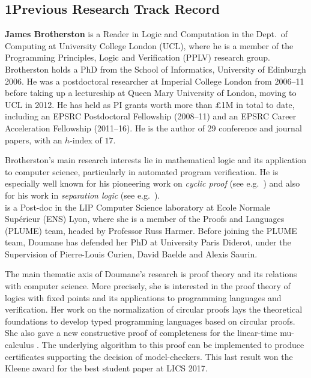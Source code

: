 \documentclass[11pt,twocolumn]{article}
\begin{document}


\begin{abstract}
  
\end{abstract}

\subsection*{1\quad Previous Research Track Record}

{\bf James Brotherston} is a Reader in Logic and Computation in the Dept.\ of Computing at University College London (UCL), where he is a member of the Programming Principles, Logic and Verification (PPLV) research group.  Brotherston holds a PhD from the School of Informatics, University of Edinburgh 2006.  He was a postdoctoral researcher at Imperial College London from 2006--11 before taking up a lectureship at Queen Mary University of London, moving to UCL in 2012. He has held as PI grants worth more than $\pounds$1M in total to date, including an EPSRC Postdoctoral Fellowship (2008--11) and an EPSRC Career Acceleration Fellowship (2011--16). He is the author of 29 conference and journal papers, with an $h$-index of $17$.

Brotherston's main research interests lie in mathematical logic and its application to computer science, particularly in automated program verification. He is especially well known for his pioneering work on \emph{cyclic proof} (see e.g.~) and also for his work in \emph{separation logic} (see e.g.~).  \\

  is a Post-doc in the
LIP Computer Science laboratory at Ecole Normale
Supérieur (ENS) Lyon, where she is a member of the
Proofs and Languages (PLUME) team, headed by Professor
Russ Harmer. Before joining the PLUME team,
Doumane has defended her PhD at University Paris Diderot,
under the Supervision of Pierre-Louis Curien, David
Baelde and Alexis Saurin.


The main thematic axis of Doumane's research is proof theory and its relations with computer science. More precisely, she is interested in the proof theory of logics with fixed points and its applications to programming languages and verification. Her work on the normalization of circular proofs \cite{baelde16csl} lays the theoretical foundations to develop typed programming languages based on circular proofs. She also gave a new constructive proof of completeness for the linear-time mu-calculus \cite{doumane16lics, doumane17lics}. The underlying  algorithm to this proof can be implemented to produce certificates supporting the decision of model-checkers. This last result won the Kleene award for the best student paper at LICS 2017. 
\end{document}
